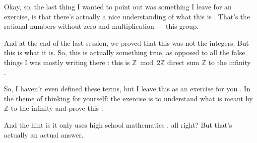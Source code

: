 \begin{speech}[00:42:21 - 00:43:32]
Okay, so, the last thing I wanted to point out was something I leave for an exercise, is that there's actually a nice understanding of what this is . That's the rational numbers without zero and multiplication --- this group.

And at the end of the last session, we proved that this was not the integers. But this is what it is. So, this is actually something true, as opposed to all the false things I was mostly writing there : this is $\mathbb{Z} \bmod 2\mathbb{Z}$ direct sum $\mathbb{Z}$ to the infinity .

So, I haven't even defined these terms, but I leave this as an exercise for you . In the theme of thinking for yourself: the exercise is to understand what is meant by $\mathbb{Z}$ to the infinity and prove this .

And the hint is it only uses high school mathematics , all right? But that's actually an actual answer.
\end{speech}

